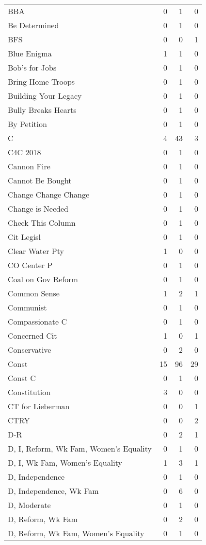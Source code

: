 \begin{supertabular}{lrrr}
BBA & 0 & 1 & 0\\
Be Determined & 0 & 1 & 0\\
BFS & 0 & 0 & 1\\
Blue Enigma & 1 & 1 & 0\\
Bob's for Jobs & 0 & 1 & 0\\
Bring Home Troops & 0 & 1 & 0\\
Building Your Legacy & 0 & 1 & 0\\
Bully Breaks Hearts & 0 & 1 & 0\\
By Petition & 0 & 1 & 0\\
C & 4 & 43 & 3\\
C4C 2018 & 0 & 1 & 0\\
Cannon Fire & 0 & 1 & 0\\
Cannot Be Bought & 0 & 1 & 0\\
Change Change Change & 0 & 1 & 0\\
Change is Needed & 0 & 1 & 0\\
Check This Column & 0 & 1 & 0\\
Cit Legisl & 0 & 1 & 0\\
Clear Water Pty & 1 & 0 & 0\\
CO Center P & 0 & 1 & 0\\
Coal on Gov Reform & 0 & 1 & 0\\
Common Sense & 1 & 2 & 1\\
Communist & 0 & 1 & 0\\
Compassionate C & 0 & 1 & 0\\
Concerned Cit & 1 & 0 & 1\\
Conservative & 0 & 2 & 0\\
Const & 15 & 96 & 29\\
Const C & 0 & 1 & 0\\
Constitution & 3 & 0 & 0\\
CT for Lieberman & 0 & 0 & 1\\
CTRY & 0 & 0 & 2\\
D-R & 0 & 2 & 1\\
D, I, Reform, Wk Fam, Women's Equality & 0 & 1 & 0\\
D, I, Wk Fam, Women's Equality & 1 & 3 & 1\\
D, Independence & 0 & 1 & 0\\
D, Independence, Wk Fam & 0 & 6 & 0\\
D, Moderate & 0 & 1 & 0\\
D, Reform, Wk Fam & 0 & 2 & 0\\
D, Reform, Wk Fam, Women's Equality & 0 & 1 & 0\\

\end{supertabular}
